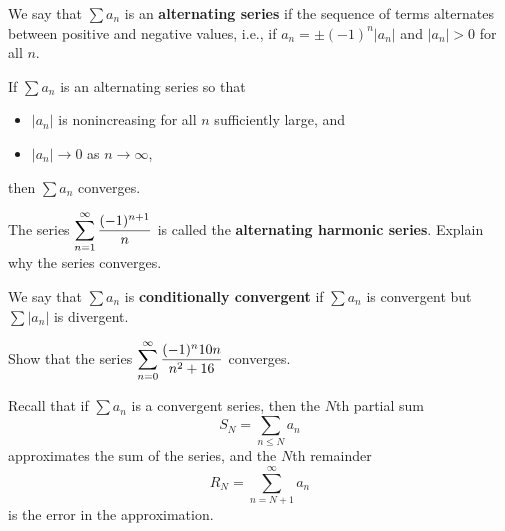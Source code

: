 

\begin{definition}
We say that $\sum a_n$ is an \textbf{alternating series} if the sequence of terms alternates between positive and negative values, 
i.e., if $a_n = \pm(-1)^n|a_n|$ and $|a_n|>0$ for all $n$. 
\end{definition}

\begin{theorem}
If $\sum a_n$ is an alternating series so that
\begin{itemize}
\item $|a_n|$ is nonincreasing for all $n$ sufficiently large, and
\item $|a_n|\to 0$ as $n\to\infty$,
\end{itemize}
then $\sum a_n$ converges.
\end{theorem}

\begin{example}
The series $\displaystyle\sum_{n=1}^\infty\frac{(-1)^{n+1}}{n}$ is called the \textbf{alternating harmonic series}.
Explain why the series converges.
\end{example}

\vfill

\begin{definition}
We say that $\sum a_n$ is \textbf{conditionally convergent} if $\sum a_n$ is convergent but $\sum |a_n|$ is divergent. 
\end{definition}

\newpage

\begin{example}
Show that the series $\displaystyle\sum_{n=0}^\infty\frac{(-1)^n 10n}{n^2+16}$ converges.
\end{example}

\newpage

\begin{remark}
Recall that if $\sum a_n$ is a convergent series, then the $N$th partial sum
\begin{equation*}
S_N = \sum_{n\le N} a_n
\end{equation*}
approximates the sum of the series, and the $N$th remainder
\begin{equation*}
 R_N = \sum_{n=N+1}^\infty a_n
\end{equation*}
is the error in the approximation.
\end{remark}

